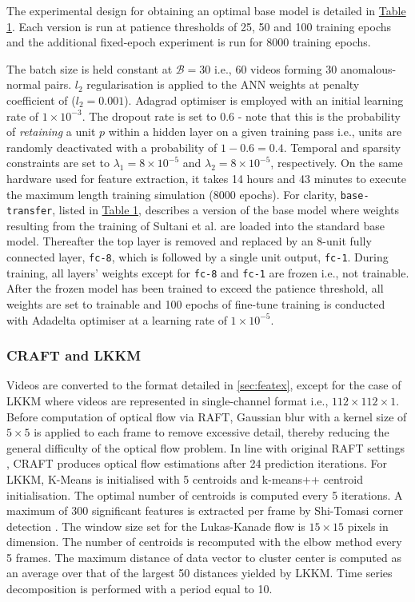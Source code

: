 \documentclass[sigplan,authorversion,nonacm, 9pt]{acmart}
\begin{document}
The experimental design for obtaining an optimal base model is detailed in \hyperref[tab:expdesign]{Table 1}.
Each version is run at patience thresholds of 25, 50 and 100 training epochs and the additional fixed-epoch experiment is run for 8000 training epochs.
 \par
 The batch size is held constant at $\mathcal{B} = 30$ i.e., 60 videos forming 30 anomalous-normal pairs. 
 $l_{2}$ regularisation is applied to the ANN weights at penalty coefficient of ($l_{2} = 0.001$). 
 Adagrad optimiser \cite{adagrad} is employed with an initial learning rate of $1 \times 10^{-3}$.
 The dropout rate is set to $0.6$ - note that this is the probability of \textit{retaining} a unit $p$ within a hidden layer on a given training pass i.e., units are randomly deactivated with a probability of $1 - 0.6 = 0.4$.
 Temporal and sparsity constraints are set to $\lambda_{1} = 8 \times 10^{-5}$ and $\lambda_{2} = 8 \times 10^{-5}$, respectively. On the same hardware used for feature extraction, it takes 14 hours and 43 minutes to execute the maximum length training simulation (8000 epochs).
 For clarity, \texttt{base-transfer}, listed in \hyperref[tab:expdesign]{Table 1}, describes a version of the base model where weights resulting from the training of Sultani et al. \cite{sultani} are loaded into the standard base model. Thereafter the top layer is removed and replaced by an 8-unit fully connected layer, \texttt{fc-8}, which is followed by a single unit output, \texttt{fc-1}. During training, all layers' weights except for \texttt{fc-8} and \texttt{fc-1} are frozen i.e., not trainable. After the frozen model has been trained to exceed the patience threshold, all weights are set to trainable and 100 epochs of fine-tune training is conducted with Adadelta optimiser \cite{adadelta} at a learning rate of $1\times10^{-5}$.
 
 
 
 \subsubsection{CRAFT and LKKM}
 Videos are converted to the format detailed in \ref{sec:featex}, except for the case of LKKM where videos are represented in single-channel format i.e., $112 \times 112 \times 1$.   
 Before computation of optical flow via RAFT, Gaussian blur with a kernel size of $5 \times 5$ is applied to each frame to remove excessive detail, thereby reducing the general difficulty of the optical flow problem.
 In line with original RAFT settings \cite{raft}, CRAFT produces optical flow estimations after 24 prediction iterations.
 For LKKM, K-Means is initialised with 5 centroids and k-means++ centroid initialisation. The optimal number of centroids is computed every 5 iterations.
 A maximum of 300 significant features is extracted per frame by Shi-Tomasi corner detection \cite{shitomasi}.
 The window size set for the Lukas-Kanade flow is $15 \times 15$ pixels in dimension.
 The number of centroids is recomputed with the elbow method every 5 frames.
 The maximum distance of data vector to cluster center is computed as an average over that of the largest 50 distances yielded by LKKM.
 Time series decomposition is performed with a period equal to 10.
\par
\end{document}
